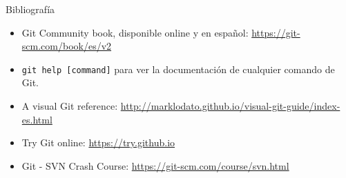 \begin{frame}[t]{Bibliografía}

    \begin{itemize}
        \item Git Community book, disponible online y en español: \url{https://git-scm.com/book/es/v2}
		\item \texttt{git help [command]} para ver la documentación de cualquier comando de Git.
		\item A visual Git reference: \url{http://marklodato.github.io/visual-git-guide/index-es.html}
		\item Try Git online: \url{https://try.github.io}
        \item Git - SVN Crash Course: \url{https://git-scm.com/course/svn.html}
    \end{itemize}

\end{frame}
